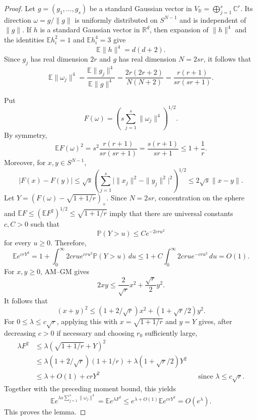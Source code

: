 \documentclass[10pt,a4paper]{amsart}
\newcommand{\C}{\mathbb C}
\newcommand{\E}{\mathbb E}
\newcommand{\Prob}{\mathbb P}
\newcommand{\R}{\mathbb R}
\begin{document}
\begin{proof}
Let $g=(g_1,\dots,g_s)$ be a standard Gaussian vector in
$V_\R=\bigoplus_{j=1}^s\C^r$.  Its direction
$\omega=g/\|g\|$ is uniformly distributed on $S^{N-1}$ and is independent of
$\|g\|$.  If $h$ is a standard Gaussian vector in $\R^d$, then expansion of
$\|h\|^4$ and the identities $\E h_i^2=1$ and $\E h_i^4=3$ give
\[
        \E\|h\|^4=d(d+2).
\]
Since $g_j$ has real dimension $2r$ and $g$ has real dimension $N=2sr$, it
follows that
\[
        \E\|\omega_j\|^4
        =\frac{\E\|g_j\|^4}{\E\|g\|^4}
        =\frac{2r(2r+2)}{N(N+2)}
        =\frac{r(r+1)}{sr(sr+1)}.
\]

Put
\[
        F(\omega)=\left(s\sum_{j=1}^s\|\omega_j\|^4\right)^{1/2}.
\]
By symmetry,
\[
        \E F(\omega)^2
        =s^2\frac{r(r+1)}{sr(sr+1)}
        =\frac{s(r+1)}{sr+1}
        \le1+\frac1r.
\]
Moreover, for $x,y\in S^{N-1}$,
\[
        |F(x)-F(y)|
        \le \sqrt{s}\left(\sum_{j=1}^s
        \bigl|\|x_j\|^2-\|y_j\|^2\bigr|^2\right)^{1/2}
        \le2\sqrt{s}\|x-y\|.
\]
Let $Y=(F(\omega)-\sqrt{1+1/r})_+$.  Since $N=2sr$, concentration on the sphere and
$\E F\le(\E F^2)^{1/2}\le\sqrt{1+1/r}$ imply that there are universal
constants $c,C>0$ such that
\[
        \Prob(Y>u)\le C e^{-2cru^2}
\]
for every $u\ge0$.
Therefore,
\[
        \E e^{crY^2}
        =1+\int_0^\infty 2cru e^{cru^2}\Prob(Y>u)\,du
        \le1+C\int_0^\infty 2cru e^{-cru^2}\,du=O(1).
\]
For $x,y\ge0$, AM--GM gives
\[
        2xy\le\frac{2}{\sqrt r}x^2+\frac{\sqrt r}{2}y^2.
\]
It follows that
\[
        (x+y)^2\le(1+2/\sqrt r)x^2+(1+\sqrt r/2)y^2.
\]
For $0\le\lambda\le c\sqrt r$, applying this with
$x=\sqrt{1+1/r}$ and $y=Y$ gives, after decreasing
$c>0$ if necessary and choosing $r_0$ sufficiently
large,
\[
\begin{aligned}
        \lambda F^2
        &\le\lambda\left(\sqrt{1+1/r}+Y\right)^2 \\
        &\le\lambda(1+2/\sqrt r)(1+1/r)
        +\lambda(1+\sqrt r/2)Y^2 \\
        &\le\lambda+O(1)+crY^2
        && \text{since $\lambda\le c\sqrt r$}.
\end{aligned}
\]
Together with the preceding moment bound, this yields
\[
        \E e^{\lambda s\sum_{j=1}^s\|\omega_j\|^4}
        =\E e^{\lambda F^2}
        \le e^{\lambda+O(1)}\E e^{crY^2}
        =O(e^\lambda).
\]
This proves the lemma.
\end{proof}
\end{document}
